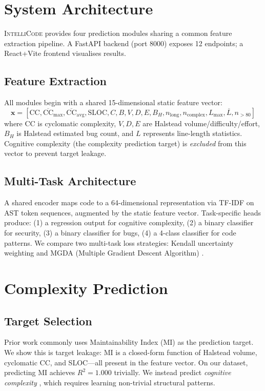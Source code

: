 \documentclass[conference]{IEEEtran}
\begin{document}
\section{System Architecture}
\label{sec:system}

\textsc{IntelliCode} provides four prediction modules sharing a common
feature extraction pipeline. A FastAPI backend (port 8000) exposes
12 endpoints; a React+Vite frontend visualises results.

\subsection{Feature Extraction}
All modules begin with a shared 15-dimensional static feature vector:
\[
  \mathbf{x} = [\text{CC}, \overline{\text{CC}}_{\max},
                \overline{\text{CC}}_{\text{avg}},
                \text{SLOC}, C, B, V, D, E, B_H,
                n_{\text{long}}, n_{\text{complex}},
                L_{\max}, \overline{L}, n_{>80}]
\]
where CC is cyclomatic complexity, $V,D,E$ are Halstead volume/difficulty/effort,
$B_H$ is Halstead estimated bug count, and $L$ represents line-length statistics.
Cognitive complexity (the complexity prediction target) is \emph{excluded}
from this vector to prevent target leakage.

\subsection{Multi-Task Architecture}
A shared encoder maps code to a 64-dimensional representation via TF-IDF on
AST token sequences, augmented by the static feature vector.
Task-specific heads produce: (1) a regression output for cognitive complexity,
(2) a binary classifier for security, (3) a binary classifier for bugs,
(4) a 4-class classifier for code patterns.
We compare two multi-task loss strategies: Kendall uncertainty weighting
\cite{kendall2018} and MGDA (Multiple Gradient Descent Algorithm) \cite{sener2018}.

\section{Complexity Prediction}
\label{sec:complexity}

\subsection{Target Selection}
Prior work \cite{oliveto2010,palomba2018} commonly uses Maintainability Index (MI)
as the prediction target.
We show this is target leakage: MI is a closed-form function of Halstead volume,
cyclomatic CC, and SLOC---all present in the feature vector.
On our dataset, predicting MI achieves $R^2 = 1.000$ trivially.
We instead predict \emph{cognitive complexity} \cite{campbell2018}, which
requires learning non-trivial structural patterns.
\end{document}
